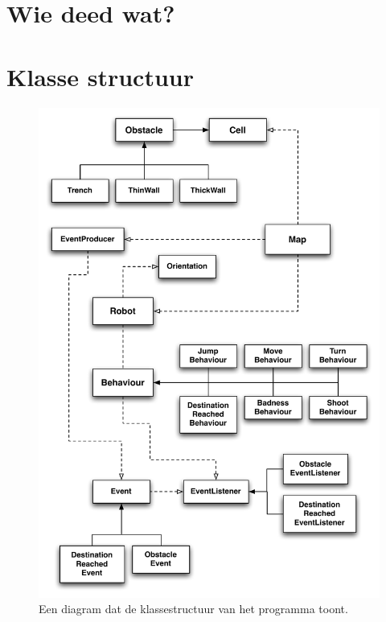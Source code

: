 \documentclass[a4paper]{article}
\begin{document}
\section*{Wie deed wat?}

\section*{Klasse structuur}
\begin{figure}
\begin{center}
\includegraphics[width=\textwidth]{diagram.pdf}
\caption{Een diagram dat de klassestructuur van het programma toont.}
\label{fig:diagram}
\end{center}
\end{figure}
\end{document}
